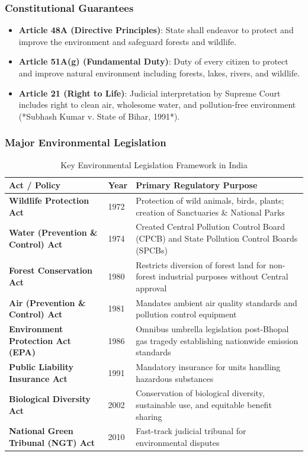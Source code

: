 \documentclass[11pt,a4paper]{article}
\begin{document}
\subsubsection{Constitutional Guarantees}
\begin{itemize}[leftmargin=*]
  \item \textbf{Article 48A (Directive Principles)}: State shall endeavor to protect and improve the environment and safeguard forests and wildlife.
  \item \textbf{Article 51A(g) (Fundamental Duty)}: Duty of every citizen to protect and improve natural environment including forests, lakes, rivers, and wildlife.
  \item \textbf{Article 21 (Right to Life)}: Judicial interpretation by Supreme Court includes right to clean air, wholesome water, and pollution-free environment (*Subhash Kumar v. State of Bihar, 1991*).
\end{itemize}

\subsubsection{Major Environmental Legislation}
\begin{table}[h!]
\centering
\small
\begin{tabularx}{\textwidth}{l l X}
\toprule
\textbf{Act / Policy} & \textbf{Year} & \textbf{Primary Regulatory Purpose} \\
\midrule
\textbf{Wildlife Protection Act} & 1972 & Protection of wild animals, birds, plants; creation of Sanctuaries \& National Parks \\
\textbf{Water (Prevention \& Control) Act} & 1974 & Created Central Pollution Control Board (CPCB) and State Pollution Control Boards (SPCBs) \\
\textbf{Forest Conservation Act} & 1980 & Restricts diversion of forest land for non-forest industrial purposes without Central approval \\
\textbf{Air (Prevention \& Control) Act} & 1981 & Mandates ambient air quality standards and pollution control equipment \\
\textbf{Environment Protection Act (EPA)} & 1986 & Omnibus umbrella legislation post-Bhopal gas tragedy establishing nationwide emission standards \\
\textbf{Public Liability Insurance Act} & 1991 & Mandatory insurance for units handling hazardous substances \\
\textbf{Biological Diversity Act} & 2002 & Conservation of biological diversity, sustainable use, and equitable benefit sharing \\
\textbf{National Green Tribunal (NGT) Act} & 2010 & Fast-track judicial tribunal for environmental disputes \\
\bottomrule
\end{tabularx}
\caption{Key Environmental Legislation Framework in India}
\end{table}
\end{document}
